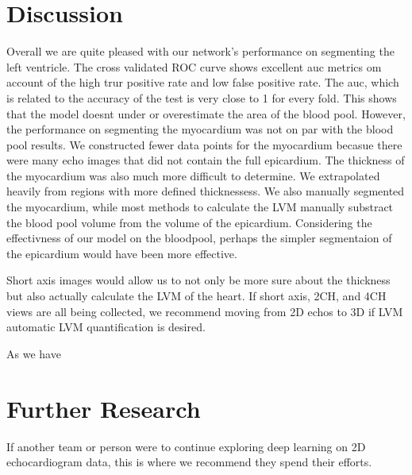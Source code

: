 \documentclass[12pt]{article}
\begin{document}

\section{Discussion}
Overall we are quite pleased with our network's performance on segmenting the left ventricle.
The cross validated ROC curve shows excellent auc metrics om account of the high trur positive rate and low false positive rate.
The auc, which is related to the accuracy of the test is very close to 1 for every fold.
This shows that the model doesnt under or overestimate the area of the blood pool.
However, the performance on segmenting the myocardium was not on par with the blood pool results.
We constructed fewer data points for the myocardium becasue there were many echo images that did not contain the full epicardium.
The thickness of the myocardium was also much more difficult to determine.
We extrapolated heavily from regions with more defined thicknessess.
We also manually segmented the myocardium, while most methods to calculate the LVM manually substract the blood pool volume from the volume of the epicardium.
Considering the effectivness of our model on the bloodpool, perhaps the simpler segmentaion of the epicardium would have been more effective.

Short axis images would allow us to not only be more sure about the thickness but also actually calculate the LVM of the heart.
If short axis, 2CH, and 4CH views are all being collected, we recommend moving from 2D echos to 3D if LVM automatic LVM quantification is desired.

As we have

\section{Further Research}
If another team or person were to continue exploring deep learning on 2D echocardiogram data, this is where we recommend they spend their efforts.
\end{document}
